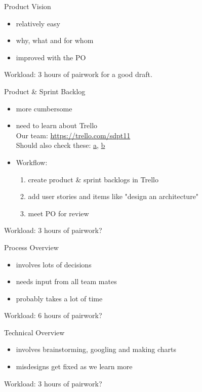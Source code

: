 \documentclass{beamer}
\newcommand{\bgset}[1]{
  \usebackgroundtemplate{
    \texttt{[image: \#1]}
  }
}
\begin{document}
\bgset{../gfx/neural1__bgmod.jpg}
\begin{frame}{Product Vision}{}
  \begin{itemize}
  \item relatively easy
  \item why, what and for whom
  \item improved with the PO
  \end{itemize}
  Workload: 3 hours of pairwork for a good draft.
\end{frame}
\begin{frame}{Product \& Sprint Backlog}{}
  \begin{itemize}
  \item more cumbersome
  \item need to learn about Trello \\
    Our team: \url{https://trello.com/sdpt11} \\
    Should also check these:
    \href{http://scrumfortrello.com/}{a},
    \href{http://www.tommasonervegna.com/blog/2014/1/9/10-effective-tips-for-using-trello-as-an-agile-scrum-project-management-tool}{b}
  \item Workflow:
    \begin{enumerate}
    \item create product \& sprint backlogs in Trello
    \item add user stories and items like "design an architecture"
    \item meet PO for review
    \end{enumerate}
  \end{itemize}
  Workload: 3 hours of pairwork?
\end{frame}
\begin{frame}{Process Overview}{}
  \begin{itemize}
  \item involves lots of decisions
  \item needs input from all team mates
  \item probably takes a lot of time
  \end{itemize}
  Workload: 6 hours of pairwork?
\end{frame}
\begin{frame}{Technical Overview}{}
  \begin{itemize}
  \item involves brainstorming, googling and making charts
  \item misdesigns get fixed as we learn more
  \end{itemize}
  Workload: 3 hours of pairwork?
\end{frame}
\end{document}
